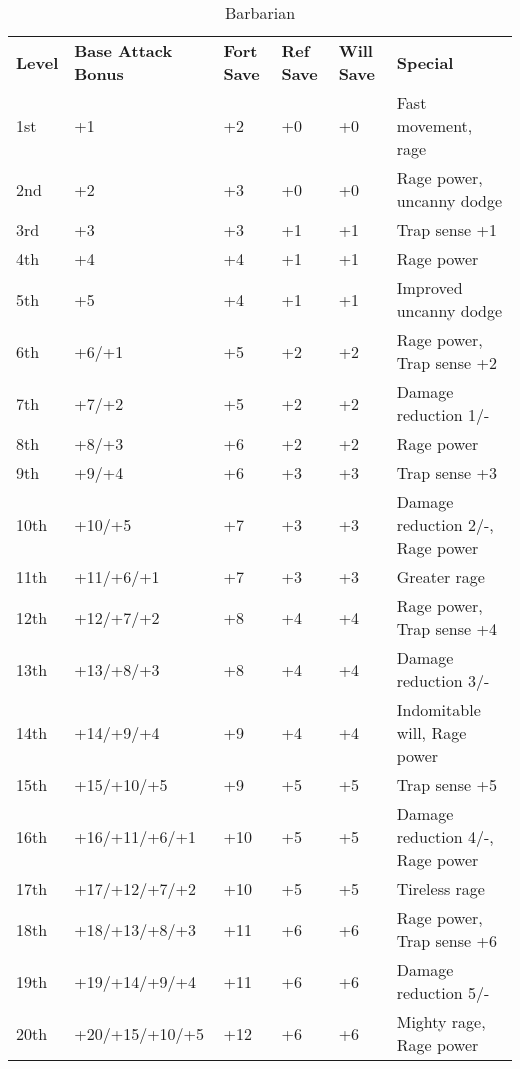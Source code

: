 \begin{table*}[]
\caption{Barbarian}
\sffamily
\begin{tabular}{llllll}
\textbf{Level} & \textbf{Base Attack Bonus} & \textbf{Fort Save} & \textbf{Ref Save} & \textbf{Will Save} & \textbf{Special}\\
1st   & +1                & +2        & +0       & +0        & Fast movement, rage              \\
2nd   & +2                & +3        & +0       & +0        & Rage power, uncanny dodge        \\
3rd   & +3                & +3        & +1       & +1        & Trap sense +1                    \\
4th   & +4                & +4        & +1       & +1        & Rage power                       \\
5th   & +5                & +4        & +1       & +1        & Improved uncanny dodge           \\
6th   & +6/+1             & +5        & +2       & +2        & Rage power, Trap sense +2        \\
7th   & +7/+2             & +5        & +2       & +2        & Damage reduction 1/-             \\
8th   & +8/+3             & +6        & +2       & +2        & Rage power                       \\
9th   & +9/+4             & +6        & +3       & +3        & Trap sense +3                    \\
10th  & +10/+5            & +7        & +3       & +3        & Damage reduction 2/-, Rage power \\
11th  & +11/+6/+1         & +7        & +3       & +3        & Greater rage                     \\
12th  & +12/+7/+2         & +8        & +4       & +4        & Rage power, Trap sense +4        \\
13th  & +13/+8/+3         & +8        & +4       & +4        & Damage reduction 3/-             \\
14th  & +14/+9/+4         & +9        & +4       & +4        & Indomitable will, Rage power     \\
15th  & +15/+10/+5        & +9        & +5       & +5        & Trap sense +5                    \\
16th  & +16/+11/+6/+1     & +10       & +5       & +5        & Damage reduction 4/-, Rage power \\
17th  & +17/+12/+7/+2     & +10       & +5       & +5        & Tireless rage                    \\
18th  & +18/+13/+8/+3     & +11       & +6       & +6        & Rage power, Trap sense +6        \\
19th  & +19/+14/+9/+4     & +11       & +6       & +6        & Damage reduction 5/-             \\
20th  & +20/+15/+10/+5    & +12       & +6       & +6        & Mighty rage, Rage power         
\end{tabular}
\end{table*}

